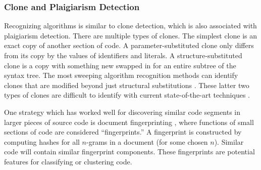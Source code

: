 \subsubsection{Clone and Plaigiarism Detection}

Recognizing algorithms is similar to clone detection, which is also associated with plaigiarism detection. There are multiple types of clones. The simplest clone is an exact copy of another section of code. A parameter-substituted clone only differs from its copy by the values of identifiers and literals. A structure-substituted clone is a copy with something new swapped in for an entire subtree of the syntax tree. The most sweeping algorithm recognition methods can identify clones that are modified beyond just structural substitutions \cite{tiarks2011extended}. These latter two types of clones are difficult to identify with current state-of-the-art techniques \cite{taherkhani12, taherkhani13}. 

One strategy which has worked well for discovering similar code segments in larger pieces of source code is document fingerprinting \cite{schleimer2003winnowing}, where functions of small sections of code are considered ``fingerprints.'' A fingerprint is constructed by computing hashes for all $n$-grams in a document (for some chosen $n$). Similar code will contain similar fingerprint components. These fingerprints are potential features for classifying or clustering code.




